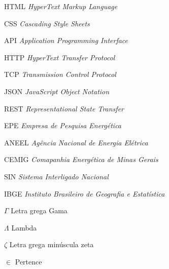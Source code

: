 \documentclass[
	12pt,				%
	oneside,
	a4paper,			%
	chapter=TITLE,
	english,			%
	brazil,				%
	]{abntex2}
\begin{document}
\begin{siglas}
\item[HTML]   \textit{HyperText Markup Language}
\item[CSS]	  \textit{Cascading Style Sheets}
\item[API]    \textit{Application Programming Interface}
\item[HTTP]   \textit{HyperText Transfer Protocol}
\item[TCP]    \textit{Transmission Control Protocol}
\item[JSON]   \textit{JavaScript Object Notation}
\item[REST]   \textit{Representational State Transfer}
\item[EPE]    \textit{Empresa de Pesquisa Energética}
\item[ANEEL]  \textit{Agência Nacional de Energia Elétrica}
\item[CEMIG]  \textit{Comapanhia Energética de Minas Gerais}
\item[SIN]    \textit{Sistema Interligado Nacional}
\item[IBGE]    \textit{Instituto Brasileiro de Geografia e Estatística}
\end{siglas}

\begin{simbolos}
  \item[$ \Gamma $] Letra grega Gama
  \item[$ \Lambda $] Lambda
  \item[$ \zeta $] Letra grega minúscula zeta
  \item[$ \in $] Pertence
\end{simbolos}

\tableofcontents*
\cleardoublepage

\textual
















% 
\postextual



%

\end{document}

